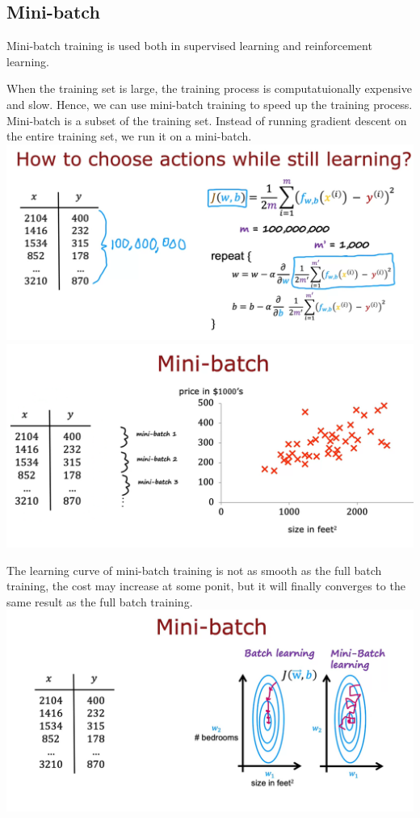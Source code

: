 \subsection*{Mini-batch}
Mini-batch training is used both in supervised learning and reinforcement learning.

When the training set is large, the training process is computatuionally expensive and slow. 
Hence, we can use mini-batch training to speed up the training process. Mini-batch is a subset of the training set.
Instead of running gradient descent on the entire training set, we run it on a mini-batch.\\
\includegraphics*[width=\textwidth]{images/19.5}
\includegraphics*[width=\textwidth]{images/19.6}

The learning curve of mini-batch training is not as smooth as the full batch training, 
the cost may increase at some ponit,
but it will finally converges to the same result as the full batch training.\\
\includegraphics*[width=\textwidth]{images/19.7}

